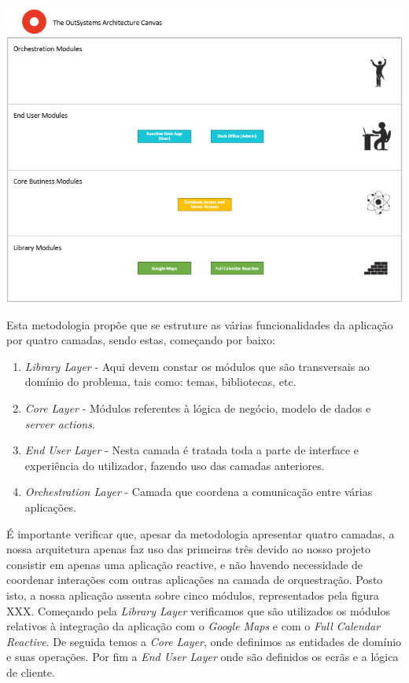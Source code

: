 \documentclass[a4paper,openright,12pt]{report}
\begin{document}
\begin{center}
    \includegraphics{figures/4LayerCanvas.png}
\end{center}




Esta metodologia propõe que se estruture as várias funcionalidades da aplicação por quatro camadas, sendo estas, começando por baixo: 
\begin{enumerate}
    \item \textit{Library Layer} - Aqui devem constar os módulos que são transversais ao domínio do problema, tais como: temas, bibliotecas, etc. 
    \item \textit{Core Layer} - Módulos referentes à lógica de negócio, modelo de dados e \textit{server actions}. 
    \item \textit{End User Layer} - Nesta camada é tratada toda a parte de interface e experiência do utilizador, fazendo uso das camadas anteriores. 
    \item \textit{Orchestration Layer} - Camada que coordena a comunicação entre várias aplicações. 
\end{enumerate}

É importante verificar que, apesar da metodologia apresentar quatro camadas, a nossa arquitetura apenas faz uso das primeiras três devido ao nosso projeto consistir em apenas uma aplicação reactive, e não havendo necessidade de coordenar interações com outras aplicações na camada de orquestração. Posto isto, a nossa aplicação assenta sobre cinco módulos, representados pela figura XXX. Começando pela \textit{Library Layer} verificamos que são utilizados os módulos relativos à integração da aplicação com o \textit{Google Maps} e com o \textit{Full Calendar Reactive}. De seguida temos a \textit{ Core Layer}, onde definimos as entidades de domínio e suas operações. Por fim a \textit{ End User Layer} onde são definidos os ecrãs e a lógica de cliente. 
\end{document}
